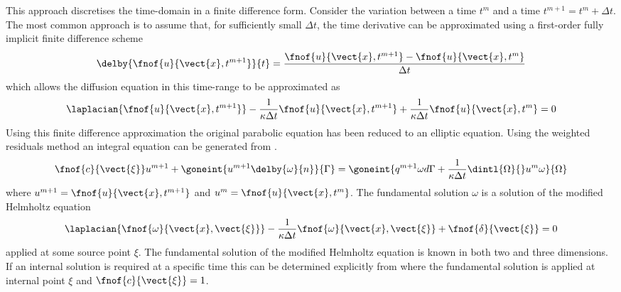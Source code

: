 This approach discretises the time-domain in a finite difference form.
Consider the variation between a time $t^{m}$ and a time $t^{m+1} =
t^{m} + \Delta t$.  The most common approach \citep{brebbia:1984} is to
assume that, for sufficiently small $\Delta t$, the time derivative can be
approximated using a first-order fully implicit finite difference scheme 
\begin{equation}
  \delby{\fnof{u}{\vect{x},t^{m+1}}}{t} =
  \dfrac{\fnof{u}{\vect{x},t^{m+1}} - \fnof{u}{\vect{x},t^{m}}}{\Delta t}
\label{eq:fdapprox}
\end{equation}
which allows the diffusion equation in this time-range to be approximated as
\begin{equation}
\laplacian{\fnof{u}{\vect{x},t^{m+1}}} - \dfrac{1}{\kappa \Delta t}
\fnof{u}{\vect{x},t^{m+1}} + \dfrac{1}{\kappa \Delta t} \fnof{u}{\vect{x},t^{m}} = 0
\label{eq:diffdapprox}
\end{equation}
Using this finite difference approximation the original parabolic equation
has been reduced to an elliptic equation.  Using the weighted residuals
method an integral equation can be generated from . 
\begin{equation}
\fnof{c}{\vect{\xi}}u^{m+1} + \goneint{u^{m+1} \delby{\omega}{n}}{\Gamma} =
\goneint{q^{m+1} \omega d\Gamma + \dfrac{1}{\kappa \Delta t}
\dintl{\Omega}{} u^{m} \omega}{\Omega}
\label{eq:fdbem}
\end{equation}
where $u^{m+1} = \fnof{u}{\vect{x},t^{m+1}}$ and $u^{m} = \fnof{u}{\vect{x},t^{m}}$.
The fundamental solution $\omega$ is a solution of the modified
Helmholtz equation
\begin{equation}
\laplacian{\fnof{\omega}{\vect{x},\vect{\xi}}} - \dfrac{1}{\kappa \Delta t}
\fnof{\omega}{\vect{x},\vect{\xi}} + \fnof{\delta}{\vect{\xi}} = 0 
\end{equation}
applied at some source point $\xi$.  The fundamental solution of the
modified Helmholtz equation is known in both two and three dimensions.  If
an internal solution is required at a specific time this can be determined
explicitly from  where the fundamental solution is applied
at internal point $\xi$ and $\fnof{c}{\vect{\xi}} = 1$.

